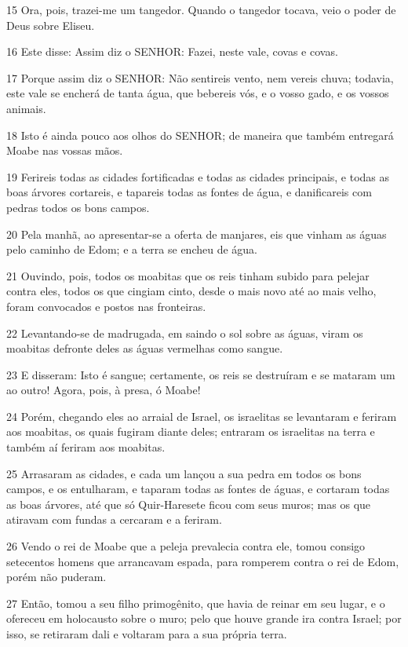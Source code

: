 \par 15 Ora, pois, trazei-me um tangedor. Quando o tangedor tocava, veio o poder de Deus sobre Eliseu.
\par 16 Este disse: Assim diz o SENHOR: Fazei, neste vale, covas e covas.
\par 17 Porque assim diz o SENHOR: Não sentireis vento, nem vereis chuva; todavia, este vale se encherá de tanta água, que bebereis vós, e o vosso gado, e os vossos animais.
\par 18 Isto é ainda pouco aos olhos do SENHOR; de maneira que também entregará Moabe nas vossas mãos.
\par 19 Ferireis todas as cidades fortificadas e todas as cidades principais, e todas as boas árvores cortareis, e tapareis todas as fontes de água, e danificareis com pedras todos os bons campos.
\par 20 Pela manhã, ao apresentar-se a oferta de manjares, eis que vinham as águas pelo caminho de Edom; e a terra se encheu de água.
\par 21 Ouvindo, pois, todos os moabitas que os reis tinham subido para pelejar contra eles, todos os que cingiam cinto, desde o mais novo até ao mais velho, foram convocados e postos nas fronteiras.
\par 22 Levantando-se de madrugada, em saindo o sol sobre as águas, viram os moabitas defronte deles as águas vermelhas como sangue.
\par 23 E disseram: Isto é sangue; certamente, os reis se destruíram e se mataram um ao outro! Agora, pois, à presa, ó Moabe!
\par 24 Porém, chegando eles ao arraial de Israel, os israelitas se levantaram e feriram aos moabitas, os quais fugiram diante deles; entraram os israelitas na terra e também aí feriram aos moabitas.
\par 25 Arrasaram as cidades, e cada um lançou a sua pedra em todos os bons campos, e os entulharam, e taparam todas as fontes de águas, e cortaram todas as boas árvores, até que só Quir-Haresete ficou com seus muros; mas os que atiravam com fundas a cercaram e a feriram.
\par 26 Vendo o rei de Moabe que a peleja prevalecia contra ele, tomou consigo setecentos homens que arrancavam espada, para romperem contra o rei de Edom, porém não puderam.
\par 27 Então, tomou a seu filho primogênito, que havia de reinar em seu lugar, e o ofereceu em holocausto sobre o muro; pelo que houve grande ira contra Israel; por isso, se retiraram dali e voltaram para a sua própria terra.

